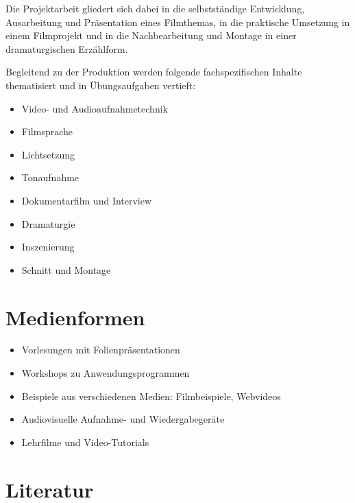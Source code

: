 Die Projektarbeit gliedert sich dabei in die selbstständige Entwicklung,
Ausarbeitung und Präsentation eines Filmthemas, in die praktische
Umsetzung in einem Filmprojekt und in die Nachbearbeitung und Montage in
einer dramaturgischen Erzählform.

Begleitend zu der Produktion werden folgende fachspezifischen Inhalte
thematisiert und in Übungsaufgaben vertieft:

\begin{itemize}
\tightlist
\item
  Video- und Audioaufnahmetechnik
\item
  Filmsprache
\item
  Lichtsetzung
\item
  Tonaufnahme
\item
  Dokumentarfilm und Interview
\item
  Dramaturgie
\item
  Inszenierung
\item
  Schnitt und Montage
\end{itemize}

\hypertarget{medienformenpathlabelmi-2017modulbeschreibungen-bachelorba_avm}{%
\section*{Medienformen\label{/mi-2017/modulbeschreibungen-bachelor/BA_AVM}}\label{medienformenpathlabelmi-2017modulbeschreibungen-bachelorba_avm}}

\begin{itemize}
\tightlist
\item
  Vorlesungen mit Folienpräsentationen
\item
  Workshops zu Anwendungsprogrammen
\item
  Beispiele aus verschiedenen Medien: Filmbeispiele, Webvideos
\item
  Audiovisuelle Aufnahme- und Wiedergabegeräte
\item
  Lehrfilme und Video-Tutorials
\end{itemize}

\hypertarget{literaturpathlabelmi-2017modulbeschreibungen-bachelorba_avm}{%
\section*{Literatur\label{/mi-2017/modulbeschreibungen-bachelor/BA_AVM}}\label{literaturpathlabelmi-2017modulbeschreibungen-bachelorba_avm}}

